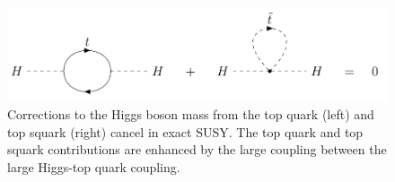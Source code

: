 \begin{figure}[hbtp]
\centering
\includegraphics[scale=0.2]{figures/intro/higgs_top_stop_corrections.png}
\caption{Corrections to the Higgs boson mass from the top quark (left) and top squark (right) cancel in exact SUSY. The top quark and top squark contributions are enhanced by the large coupling between the large Higgs-top quark coupling.}
\label{higgs_top_stop_corrections}
\end{figure}